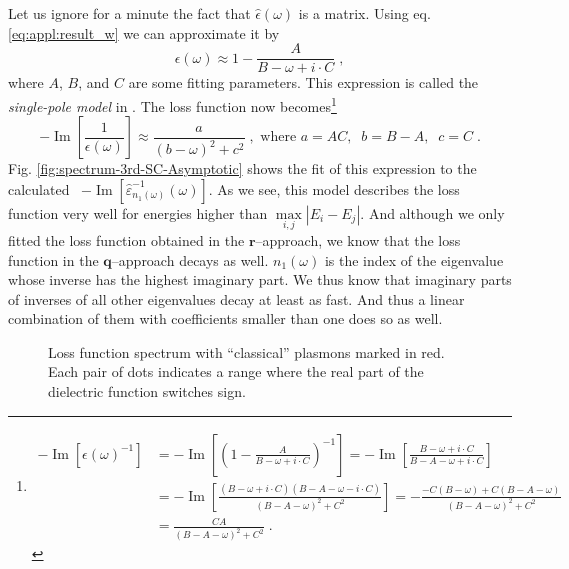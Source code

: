 \documentclass[a4paper,12pt]{article}
\begin{document}
    Let us ignore for a minute the fact that $\hat\epsilon(\omega)$ is a matrix. Using eq. \eqref{eq:appl:result_w} we can approximate it by 
    \begin{equation*}
        \epsilon(\omega) \approx 1 - \frac{A}{B - \omega + i\cdot C} \; ,
    \end{equation*}
    where $A$, $B$, and $C$ are some fitting parameters. This expression is called the \textit{single-pole model} in \cite{andersen2012spatially}. The loss function now becomes\footnote{ %
    \begin{equation*}
        \begin{aligned}
        -\operatorname{Im}[\epsilon(\omega)^{-1}] &= -\operatorname{Im}\left[\left(1 - \frac{A}{B - \omega + i\cdot C}\right)^{-1}\right]
        = -\operatorname{Im}\left[\frac{B - \omega + i\cdot C}{B - A - \omega + i\cdot C}\right] \\
        &= -\operatorname{Im}\left[\frac{(B - \omega + i\cdot C)(B - A - \omega - i\cdot C)}{(B - A - \omega)^2 + C^2}\right]
        = -\frac{-C(B - \omega) + C(B - A - \omega)}{(B - A - \omega)^2 + C^2} \\
        &= \frac{CA}{(B - A - \omega)^2 + C^2} \; .
        \end{aligned}
    \end{equation*}
    } %
    \begin{equation} \label{eq:exp:asymptotic_approx}
        -\operatorname{Im}\left[\frac{1}{\epsilon(\omega)}\right] \approx \frac{a}{(b - \omega)^2 + c^2} \;,\text{ where }a=AC ,\;\; b = B-A ,\;\; c = C\;.
    \end{equation}
    Fig. \ref{fig:spectrum-3rd-SC-Asymptotic} shows the fit of this expression to the calculated \ $-\operatorname{Im}[\hat\varepsilon^{-1}_{n_1(\omega)}(\omega)]$. As we see, this model describes the loss function very well for energies higher than $\underset{i,j}{\operatorname{max}}|E_i - E_j|$. And although we only fitted the loss function obtained in the $\mathbf{r}$--approach, we know that the loss function in the $\mathbf{q}$--approach decays as well. $n_1(\omega)$ is the index of the eigenvalue whose inverse has the highest imaginary part. We thus know that imaginary parts of inverses of all other eigenvalues decay at least as fast. And thus a linear combination of them with coefficients smaller than one does so as well.

    \begin{figure}[h] 
    \center
    
    \caption{Loss function spectrum with ``classical'' plasmons marked in red. Each pair of dots indicates a range where the real part of the dielectric function switches sign.}
    \label{fig:spectrum-3rd-SC}
    \end{figure}
\end{document}
